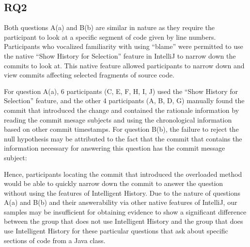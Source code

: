 
\subsection{RQ2}


Both questions A(a) and B(b) are similar in nature as they require the participant to look at a specific segment of code given by line numbers.
Participants who vocalized familiarity with using  ``blame'' were permitted to use the native ``Show History for Selection'' feature in IntelliJ to narrow down the commits to look at.
This native feature allowed participants to narrow down and view commits affecting selected fragments of source code.

For question A(a), 6 participants (C, E, F, H, I, J) used the ``Show History for Selection'' feature,
and the other 4 participants (A, B, D, G) manually found the commit that introduced the change and contained the rationale information by reading the commit mesage subjects and using the chronological information based on other commit timestamps.
For question B(b), the failure to reject the null hypothesis may be attributed to the fact that the commit  that contains the information necessary for answering this question has the commit message subject: 

\begin{center}
\end{center}

Hence, participants locating the commit that introduced the overloaded  method would be able to quickly narrow down the commit
to answer the question without using the features of Intelligent History.
Due to the nature of questions A(a) and B(b) and their answerability via other native features of IntelliJ, our samples may be insufficient for obtaining evidence to show a significant difference between the group that does not use Intelligent History and the group that does use Intelligent History for these particular questions that ask about specific sections of code from a Java class.

